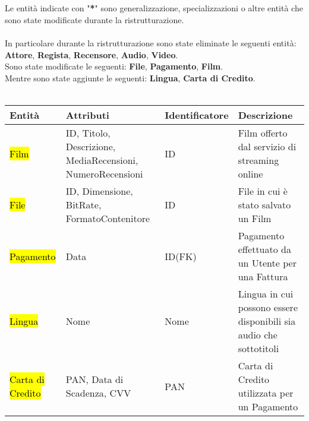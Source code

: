 \documentclass{article}
\begin{document}
\\ \\  
\\ \\
    Le entità indicate con "\textbf{*}" sono generalizzazione, specializzazioni o altre entità che sono state modificate durante la ristrutturazione.
\\ 
\\
In particolare durante la ristrutturazione sono state eliminate le seguenti entità: \textbf{Attore}, \textbf{Regista}, \textbf{Recensore}, \textbf{Audio}, \textbf{Video}. 
\\
Sono state modificate le seguenti: \textbf{File}, \textbf{Pagamento}, \textbf{Film}.
\\
Mentre sono state aggiunte le seguenti: \textbf{Lingua}, \textbf{Carta di Credito}.
\\
\\
\begin{tabular}{|C{1.3cm}|C{2.8cm}|C{2.3cm}|C{4cm}|}
\hline
\textbf{Entità}& \textbf{Attributi}& \textbf{Identificatore}& \textbf{Descrizione}\\ 
\hline
\hline
 \hl{Film} & ID, Titolo, Descrizione, MediaRecensioni, NumeroRecensioni & ID & Film offerto dal servizio di streaming online \\
\hline
 \hl{File} & ID, Dimensione, BitRate, FormatoContenitore & ID & File in cui è stato salvato un Film\\
\hline
 \hl{Pagamento} & Data & ID(FK) & Pagamento effettuato da un Utente per una Fattura\\
\hline
 \hl{Lingua} & Nome & Nome & Lingua in cui possono essere disponibili sia audio che sottotitoli\\
\hline
 \hl{Carta di Credito} & PAN, Data di Scadenza, CVV & PAN & Carta di Credito utilizzata per un Pagamento\\
\hline
\end{tabular}
%
%
%
%
%
% 
%
%
\end{document}
